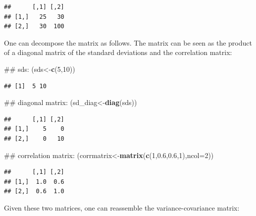 \documentclass[12pt,]{krantz}
\newenvironment{Shaded}{\begin{snugshade}}{\end{snugshade}}
\newcommand{\KeywordTok}[1]{\textcolor[rgb]{0.13,0.29,0.53}{\textbf{#1}}}
\newcommand{\DataTypeTok}[1]{\textcolor[rgb]{0.13,0.29,0.53}{#1}}
\newcommand{\DecValTok}[1]{\textcolor[rgb]{0.00,0.00,0.81}{#1}}
\newcommand{\FloatTok}[1]{\textcolor[rgb]{0.00,0.00,0.81}{#1}}
\newcommand{\OperatorTok}[1]{\textcolor[rgb]{0.81,0.36,0.00}{\textbf{#1}}}
\newcommand{\NormalTok}[1]{#1}
\theoremstyle{definition}
\theoremstyle{definition}
\theoremstyle{definition}
\theoremstyle{remark}
\begin{document}
\begin{verbatim}
##      [,1] [,2]
## [1,]   25   30
## [2,]   30  100
\end{verbatim}

One can decompose the matrix as follows. The matrix can be seen as the
product of a diagonal matrix of the standard deviations and the
correlation matrix:

\begin{Shaded}
\begin{Highlighting}[]
\NormalTok{## sds:}
\NormalTok{(sds<-}\KeywordTok{c}\NormalTok{(}\DecValTok{5}\NormalTok{,}\DecValTok{10}\NormalTok{))}
\end{Highlighting}
\end{Shaded}

\begin{verbatim}
## [1]  5 10
\end{verbatim}

\begin{Shaded}
\begin{Highlighting}[]
\NormalTok{## diagonal matrix:}
\NormalTok{(sd_diag<-}\KeywordTok{diag}\NormalTok{(sds))}
\end{Highlighting}
\end{Shaded}

\begin{verbatim}
##      [,1] [,2]
## [1,]    5    0
## [2,]    0   10
\end{verbatim}

\begin{Shaded}
\begin{Highlighting}[]
\NormalTok{## correlation matrix:}
\NormalTok{(corrmatrix<-}\KeywordTok{matrix}\NormalTok{(}\KeywordTok{c}\NormalTok{(}\DecValTok{1}\NormalTok{,}\FloatTok{0.6}\NormalTok{,}\FloatTok{0.6}\NormalTok{,}\DecValTok{1}\NormalTok{),}\DataTypeTok{ncol=}\DecValTok{2}\NormalTok{))}
\end{Highlighting}
\end{Shaded}

\begin{verbatim}
##      [,1] [,2]
## [1,]  1.0  0.6
## [2,]  0.6  1.0
\end{verbatim}

Given these two matrices, one can reassemble the variance-covariance
matrix:

\begin{Shaded}
\end{Shaded}
\end{document}
